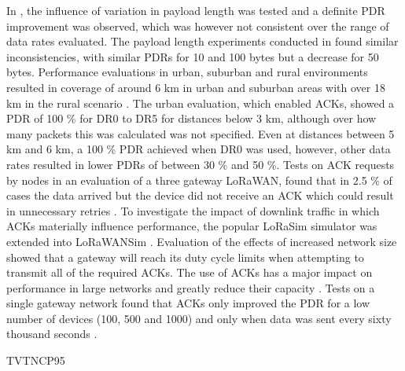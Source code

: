 In \cite{sanchez-iborra_performance_2018},
	the influence of variation in payload length was tested and a definite PDR improvement was observed,
	which was however not consistent over the range of data rates evaluated.
The payload length experiments conducted in \cite{aref_free_2014} found similar inconsistencies,
	with similar PDRs for 10 and 100 bytes but a decrease for 50 bytes.
Performance evaluations in urban,
	suburban and rural environments resulted in coverage of around 6 km in urban and suburban areas with over 18 km in the rural scenario \cite{sanchez-iborra_performance_2018}.
The urban evaluation,
	which enabled ACKs,
	showed a PDR of 100 \% for DR0 to DR5 for distances below 3 km,
although over how many packets this was calculated was not specified.
Even at distances between 5 km and 6 km,
	a 100 \% PDR achieved
when DR0 was used,
	however,
	other data rates resulted in lower PDRs of between 30 \% and 50 \%.
Tests on ACK requests by nodes in an evaluation of a three gateway LoRaWAN,
	found that in 2.5 \% of cases the data arrived but the device did not receive an ACK which could result in unnecessary retries \cite{wixted_evaluation_2016}.
To investigate the impact of downlink traffic in which ACKs materially influence performance,
	the popular LoRaSim simulator was extended into LoRaWANSim \cite{pop_does_2017}.
Evaluation of the effects of increased network size showed that a gateway will reach its duty cycle limits when attempting to transmit all of the required ACKs.
The use of ACKs has a major impact on performance in large networks and greatly reduce their capacity \cite{pop_does_2017}.
Tests on a single gateway network found that ACKs only improved the PDR for a low number of devices (100, 500 and 1000) and only when data was sent every sixty thousand seconds \cite{abeele_scalability_2017}.

\cite{pop_does_2017} TVTNCP95

